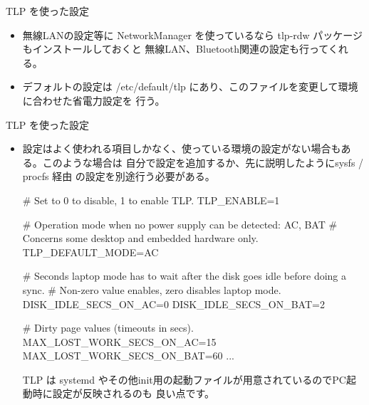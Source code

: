 \begin{frame}[containsverbatim]{TLP を使った設定}

\begin{itemize}
\item 無線LANの設定等に NetworkManager を使っているなら tlp-rdw パッケージもインストールしておくと
無線LAN、Bluetooth関連の設定も行ってくれる。

\item デフォルトの設定は /etc/default/tlp にあり、このファイルを変更して環境に合わせた省電力設定を
行う。

\end{itemize}
\end{frame}

\begin{frame}[containsverbatim]{TLP を使った設定}
\begin{itemize}

\item 設定はよく使われる項目しかなく、使っている環境の設定がない場合もある。このような場合は
自分で設定を追加するか、先に説明したようにsysfs / procfs 経由
の設定を別途行う必要がある。

\begin{center}
\begin{commandline}
# Set to 0 to disable, 1 to enable TLP.
TLP_ENABLE=1

# Operation mode when no power supply can be detected: AC, BAT
# Concerns some desktop and embedded hardware only.
TLP_DEFAULT_MODE=AC

# Seconds laptop mode has to wait after the disk goes idle before doing a sync.
# Non-zero value enables, zero disables laptop mode.
DISK_IDLE_SECS_ON_AC=0
DISK_IDLE_SECS_ON_BAT=2

# Dirty page values (timeouts in secs).
MAX_LOST_WORK_SECS_ON_AC=15
MAX_LOST_WORK_SECS_ON_BAT=60
...
\end{commandline}
\end{center}

TLP は systemd やその他init用の起動ファイルが用意されているのでPC起動時に設定が反映されるのも
良い点です。

\end{itemize}

\end{frame}

